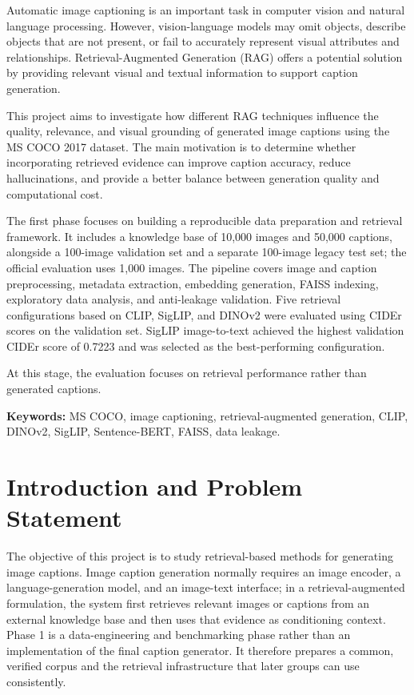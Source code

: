 \documentclass{article}
\begin{document}


Automatic image captioning is an important task in computer vision and natural language processing. However, vision-language models may omit objects, describe objects that are not present, or fail to accurately represent visual attributes and relationships. Retrieval-Augmented Generation (RAG) offers a potential solution by providing relevant visual and textual information to support caption generation.

This project aims to investigate how different RAG techniques influence the quality, relevance, and visual grounding of generated image captions using the MS COCO 2017 dataset. The main motivation is to determine whether incorporating retrieved evidence can improve caption accuracy, reduce hallucinations, and provide a better balance between generation quality and computational cost.

The first phase focuses on building a reproducible data preparation and retrieval framework. It includes a knowledge base of 10,000 images and 50,000 captions, alongside a 100-image validation set and a separate 100-image legacy test set; the official evaluation uses 1,000 images. The pipeline covers image and caption preprocessing, metadata extraction, embedding generation, FAISS indexing, exploratory data analysis, and anti-leakage validation. Five retrieval configurations based on CLIP, SigLIP, and DINOv2 were evaluated using CIDEr scores on the validation set. SigLIP image-to-text achieved the highest validation CIDEr score of 0.7223 and was selected as the best-performing configuration.

At this stage, the evaluation focuses on retrieval performance rather than generated captions.

\textbf{Keywords:} MS COCO, image captioning, retrieval-augmented
generation, CLIP, DINOv2, SigLIP, Sentence-BERT, FAISS, data leakage.



\newpage

\setcounter{section}{0}
\section{Introduction and Problem
Statement}\label{introduction-and-problem-statement}

The objective of this project is to study retrieval-based methods for
generating image captions. Image caption generation normally requires an
image encoder, a language-generation model, and an image-text interface;
in a retrieval-augmented formulation, the system first retrieves
relevant images or captions from an external knowledge base and then
uses that evidence as conditioning context. Phase 1 is a
data-engineering and benchmarking phase rather than an implementation of
the final caption generator. It therefore prepares a common, verified
corpus and the retrieval infrastructure that later groups can use
consistently.
\end{document}
